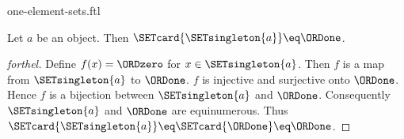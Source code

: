 \documentclass{naproche-library}
\begin{document}
\begin{smodule}[title=$1$-Element Sets]{one-element-sets.ftl}

\begin{proposition}[forthel,id=SET_THEORY_07_836893598023680]
  Let $a$ be an object.
  Then $\SETcard{\SETsingleton{a}} \eq \ORDone$.
\end{proposition}
\begin{proof}[forthel]
  Define $f(x) = \ORDzero$ for $x \in \SETsingleton{a}$.
  Then $f$ is a map from $\SETsingleton{a}$ to $\ORDone$.
  $f$ is injective and surjective onto $\ORDone$.
  Hence $f$ is a bijection between $\SETsingleton{a}$ and $\ORDone$.
  Consequently $\SETsingleton{a}$ and $\ORDone$ are equinumerous.
  Thus $\SETcard{\SETsingleton{a}} \eq \SETcard{\ORDone} \eq \ORDone$.
\end{proof}
\end{smodule}
\end{document}
